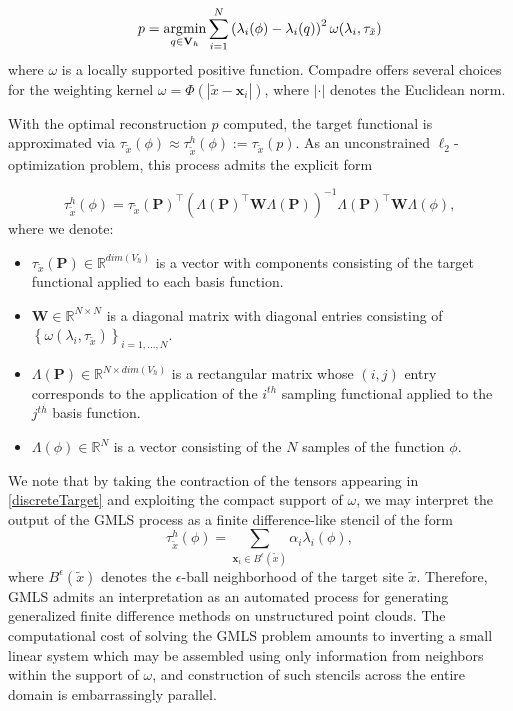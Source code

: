\begin{equation}
\label{gmls}
p = \underset{{q \in \mathbf{V}_h}}{\operatorname*{\arg\!\min}} \sum_{i=1}^N \left( \lambda_i(\phi) -\lambda_i(q) \right)^2 \omega(\lambda_i,\tau_{\tilde{x}})
\end{equation}
where $\omega$ is a locally supported positive function. Compadre offers several choices for the weighting kernel $\omega = \Phi(|\tilde{x}-\mathbf{x}_i|)$, where $|\cdot|$ denotes the Euclidean norm.

With the optimal reconstruction $p$ computed, the target functional is approximated via $\tau_{\tilde{x}} (\phi) \approx \tau^h_{\tilde{x}} (\phi) := \tau_{\tilde{x}} (p)$. As an unconstrained $\ell_2$-optimization problem, this process admits the explicit form


\begin{equation}
\label{discreteTarget}
\tau^h_{\tilde{x}}(\phi) = \tau_{\tilde{x}}(\mathbf{P})^\intercal \left(\Lambda(\mathbf{P})^\intercal \mathbf{W} \Lambda(\mathbf{P})\right)^{-1} \Lambda(\mathbf{P})^\intercal \mathbf{W} \Lambda(\phi),
\end{equation}
where we denote:
\begin{itemize}
  \item $\tau_{\tilde{x}}(\mathbf{P}) \in \mathbb{R}^{dim(V_h)}$ is a vector with components consisting of the target functional applied to each basis function.
  \item $\mathbf{W} \in \mathbb{R}^{N \times N}$ is a diagonal matrix with diagonal entries consisting of $\left\{\omega(\lambda_i,\tau_{\tilde{x}})\right\}_{i=1,...,N}$.
  \item $\Lambda(\mathbf{P}) \in \mathbb{R}^{N \times dim(V_h)}$ is a rectangular matrix whose $(i,j)$ entry corresponds to the application of the $i^{th}$ sampling functional applied to the $j^{th}$ basis function.
  \item $\Lambda(\phi) \in \mathbb{R}^N$ is a vector consisting of the $N$ samples of the function $\phi$.
\end{itemize}
We note that by taking the contraction of the tensors appearing in \eqref{discreteTarget} and exploiting the compact support of $\omega$, we may interpret the output of the GMLS process as a finite difference-like stencil of the form 
\begin{equation}
\tau^h_{\tilde{x}}(\phi) = \sum_{\mathbf{x}_i \in B^\epsilon(\tilde{x})} \alpha_i \lambda_i(\phi),
\end{equation}
where $B^\epsilon(\tilde{x})$ denotes the $\epsilon$-ball neighborhood of the target site $\tilde{x}$. Therefore, GMLS admits an interpretation as an automated process for generating generalized finite difference methods on unstructured point clouds. The computational cost of solving the GMLS problem amounts to inverting a small linear system which may be assembled using only information from neighbors within the support of $\omega$, and construction of such stencils across the entire domain is embarrassingly parallel. 


